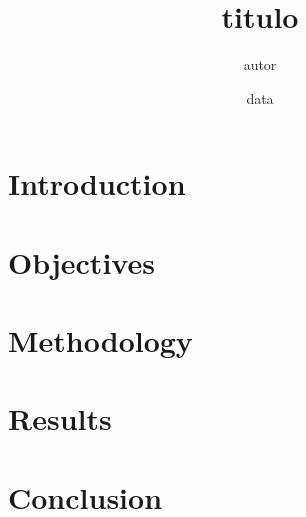 \documentclass[12pt, a4paper, twocolumn]{article}
{general}
\title{{titulo}}
\author{{autor}}
\date{{data}}
\begin{document}
\maketitle
\tableofcontents
\newpage

\section{Introduction}


\section{Objectives}


\section{Methodology}


\section{Results}


\section{Conclusion}




\end{document}
